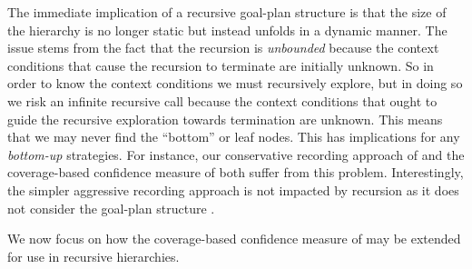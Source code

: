The immediate implication of a recursive goal-plan structure is that the size of the hierarchy is no longer static but instead unfolds in a dynamic manner. The issue stems from the fact that the recursion is \textit{unbounded} because the context conditions that cause the recursion to terminate are initially unknown. So in order to know the context conditions we must recursively explore, but in doing so we risk an infinite recursive call because the context conditions that ought to guide the recursive exploration towards termination are unknown. This means that we may never find the ``bottom'' or leaf nodes. This has implications for any \textit{bottom-up} strategies. For instance, our conservative recording approach of \cite{Airiau:IJAT:09} and the coverage-based confidence measure of \cite{Singh:AAMAS10} both suffer from this problem. Interestingly, the simpler aggressive recording approach is not impacted by recursion as it does not consider the goal-plan structure . 

We now focus on how the coverage-based confidence measure of \cite{Singh:AAMAS10} may be extended for use in recursive hierarchies.




